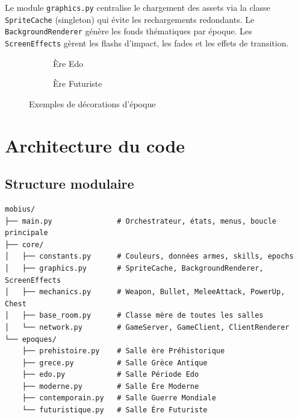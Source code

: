 \documentclass[12pt, a4paper]{report}
\begin{document}
Le module \texttt{graphics.py} centralise le chargement des assets via la classe \texttt{SpriteCache} (singleton) qui \'{e}vite les rechargements redondants. Le \texttt{BackgroundRenderer} g\'{e}n\`{e}re les fonds th\'{e}matiques par \'{e}poque. Les \texttt{ScreenEffects} g\`{e}rent les flashs d'impact, les fades et les effets de transition.

\begin{figure}[H]
  \centering
  \begin{subfigure}[b]{0.47\textwidth}
    \caption{\`{E}re Edo}
  \end{subfigure}
  \hfill
  \begin{subfigure}[b]{0.47\textwidth}
    \caption{\`{E}re Futuriste}
  \end{subfigure}
  \caption{Exemples de d\'{e}corations d'\'{e}poque}
\end{figure}

\section{Architecture du code}

\subsection{Structure modulaire}

\begin{verbatim}
mobius/
├── main.py               # Orchestrateur, états, menus, boucle principale
├── core/
│   ├── constants.py      # Couleurs, données armes, skills, epochs
│   ├── graphics.py       # SpriteCache, BackgroundRenderer, ScreenEffects
│   ├── mechanics.py      # Weapon, Bullet, MeleeAttack, PowerUp, Chest
│   ├── base_room.py      # Classe mère de toutes les salles
│   └── network.py        # GameServer, GameClient, ClientRenderer
└── epoques/
    ├── prehistoire.py    # Salle ère Préhistorique
    ├── grece.py          # Salle Grèce Antique
    ├── edo.py            # Salle Période Edo
    ├── moderne.py        # Salle Ère Moderne
    ├── contemporain.py   # Salle Guerre Mondiale
    └── futuristique.py   # Salle Ère Futuriste
\end{verbatim}
\end{document}
